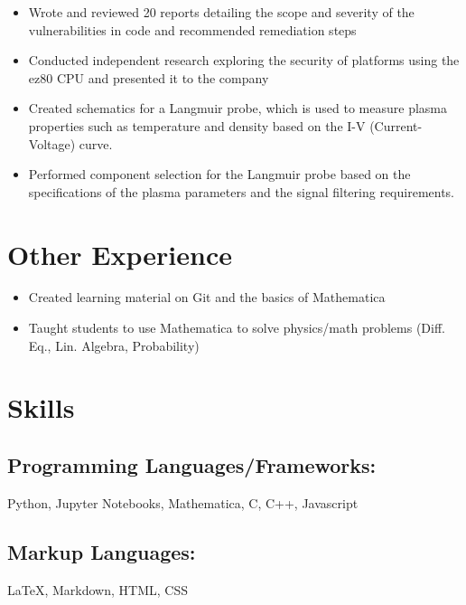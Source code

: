 \documentclass[letterpaper,11pt]{article}
\begin{document}
\begin{itemize}
    \item Wrote and reviewed 20 reports detailing the scope and severity of the vulnerabilities in code and recommended remediation steps 
    \item Conducted independent research exploring the security of platforms using the ez80 CPU and presented it to the company
\end{itemize}


\begin{itemize}
    \item Created schematics for a Langmuir probe, which is used to measure plasma properties such as temperature and density based on the I-V (Current-Voltage) curve.
 \item Performed component selection for the Langmuir probe based on the specifications of the plasma parameters and the signal filtering requirements.
\end{itemize}

\section{Other Experience}
\begin{itemize}
	\item Created learning material on Git and the basics of Mathematica
	\item Taught students to use Mathematica to solve physics/math problems (Diff. Eq., Lin. Algebra, Probability)
\end{itemize}

\section{Skills}
\subsection{Programming Languages/Frameworks:}
Python, Jupyter Notebooks, Mathematica, C, C++, Javascript
\subsection{Markup Languages:}
{\LaTeX}, Markdown, HTML, CSS
\end{document}
